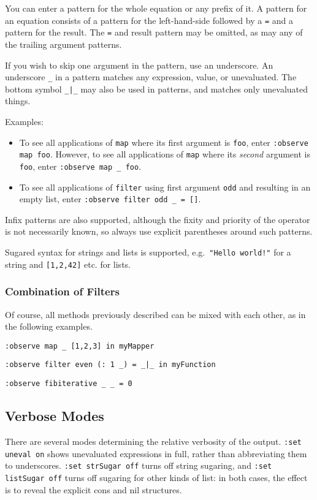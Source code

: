 \documentclass[12pt]{article}
\newcommand{\com}[1]{\texttt{#1}}
\begin{document}
You can enter a pattern for the whole equation or any prefix of it.
A pattern for an equation consists of a pattern for the left-hand-side
followed by a \texttt{=} and a pattern for the result.  The \texttt{=}
and result pattern may be omitted, as may any of the trailing
argument patterns.

If you wish to skip one argument in the pattern, use an underscore.
An underscore \texttt{\_} in a pattern matches any expression, value,
or unevaluated.  The bottom symbol \texttt{\_|\_} may also be used
in patterns, and matches only unevaluated things.

Examples:
\begin{itemize}
\item To see all applications of \texttt{map} where its first argument is
  \texttt{foo}, enter \com{:observe map foo}.  However, to see all
  applications of \texttt{map} where its \emph{second} argument is
  \texttt{foo}, enter \com{:observe map \_ foo}.

\item To see all applications of \texttt{filter} using first argument
  \texttt{odd} and resulting in an empty list, enter
  \com{:observe filter odd \_ = []}.
\end{itemize}

Infix patterns are also supported, although the fixity and priority
of the operator is not necessarily known, so always use explicit
parentheses around such patterns.

Sugared syntax for strings and lists is supported, e.g.\ \texttt{"Hello
world!"} for a string and \texttt{[1,2,42]} etc. for lists.

\subsubsection{Combination of Filters}

Of course, all methods previously described can be mixed with each
other, as in the following examples.

\texttt{:observe map \_ [1,2,3] in myMapper}

\texttt{:observe filter even (: 1 \_) = \_|\_ in myFunction}

\texttt{:observe fibiterative \_ \_ = 0}

\subsection{Verbose Modes}

There are several modes determining the relative verbosity of the
output.  \com{:set uneval on} shows unevaluated expressions in full,
rather than abbreviating them to underscores.  \com{:set strSugar
off} turns off string sugaring, and \com{:set listSugar off} turns
off sugaring for other kinds of list: in both cases, the effect is
to reveal the explicit cons and nil structures.
\end{document}
